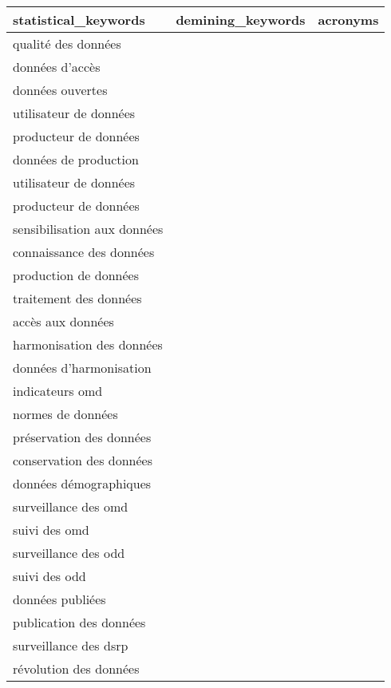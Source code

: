 \documentclass[
]{article}
\begin{document}
\begin{table}[H]
\centering\begingroup\fontsize{10}{12}\selectfont

\begin{tabular}{l|l|l}
\hline
statistical\_keywords & demining\_keywords & acronyms\\
\hline
qualité des données &  & \\
\hline
données d'accès &  & \\
\hline
données ouvertes &  & \\
\hline
utilisateur de données &  & \\
\hline
producteur de données &  & \\
\hline
données de production &  & \\
\hline
utilisateur de données &  & \\
\hline
producteur de données &  & \\
\hline
sensibilisation aux données &  & \\
\hline
connaissance des données &  & \\
\hline
production de données &  & \\
\hline
traitement des données &  & \\
\hline
accès aux données &  & \\
\hline
harmonisation des données &  & \\
\hline
données d'harmonisation &  & \\
\hline
indicateurs omd &  & \\
\hline
normes de données &  & \\
\hline
préservation des données &  & \\
\hline
conservation des données &  & \\
\hline
données démographiques &  & \\
\hline
surveillance des omd &  & \\
\hline
suivi des omd &  & \\
\hline
surveillance des odd &  & \\
\hline
suivi des odd &  & \\
\hline
données publiées &  & \\
\hline
publication des données &  & \\
\hline
surveillance des dsrp &  & \\
\hline
révolution des données &  & \\
\hline
\end{tabular}
\endgroup{}
\end{table}
\end{document}
